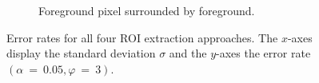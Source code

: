 \begin{figure}[H]
\begin{subfigure}[t]{0.45\linewidth}
		\caption{Foreground pixel surrounded by foreground.}
		\label{fig: alpha0.05_phi3_foreground_free}
	\end{subfigure}
	\caption{Error rates for all four ROI extraction approaches. The $x$-axes display the standard deviation $\sigma$ and the $y$-axes the error rate $(\alpha~=~0.05, \varphi~=~3)$.}
	\label{fig: alpha0.05_phi3}
\end{figure}